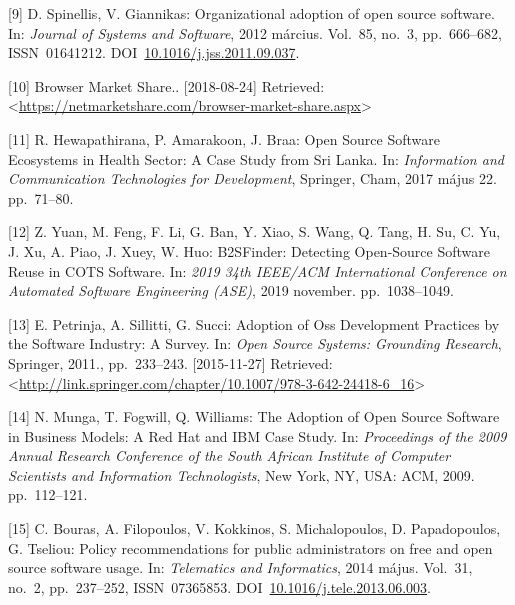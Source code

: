 \documentclass[12pt,magyar,a4paper,oneside]{scrreprt}
\newenvironment{cslreferences}%
  {}%
  {\par}
\begin{document}
\begin{cslreferences}
\leavevmode\hypertarget{ref-spinellis_organizational_2012}{}%
{[}9{]} D. Spinellis, V. Giannikas: Organizational adoption of open
source software. In: \emph{Journal of Systems and Software}, 2012
március. Vol.~85, no.~3, pp.~666--682, ISSN~01641212.
DOI~\href{https://doi.org/10.1016/j.jss.2011.09.037}{10.1016/j.jss.2011.09.037}.

\leavevmode\hypertarget{ref-noauthor_browser_nodate}{}%
{[}10{]} Browser Market Share.. {[}2018-08-24{]} Retrieved:
\textless{}\url{https://netmarketshare.com/browser-market-share.aspx}\textgreater{}

\leavevmode\hypertarget{ref-hewapathirana_open_2017}{}%
{[}11{]} R. Hewapathirana, P. Amarakoon, J. Braa: Open Source Software
Ecosystems in Health Sector: A Case Study from Sri Lanka. In:
\emph{Information and Communication Technologies for Development},
Springer, Cham, 2017 május 22. pp.~71--80.

\leavevmode\hypertarget{ref-yuan_b2sfinder_2019}{}%
{[}12{]} Z. Yuan, M. Feng, F. Li, G. Ban, Y. Xiao, S. Wang, Q. Tang, H.
Su, C. Yu, J. Xu, A. Piao, J. Xuey, W. Huo: B2SFinder: Detecting
Open-Source Software Reuse in COTS Software. In: \emph{2019 34th
IEEE/ACM International Conference on Automated Software Engineering
(ASE)}, 2019 november. pp.~1038--1049.

\leavevmode\hypertarget{ref-petrinja_adoption_2011}{}%
{[}13{]} E. Petrinja, A. Sillitti, G. Succi: Adoption of Oss Development
Practices by the Software Industry: A Survey. In: \emph{Open Source
Systems: Grounding Research}, Springer, 2011., pp.~233--243.
{[}2015-11-27{]} Retrieved:
\textless{}\url{http://link.springer.com/chapter/10.1007/978-3-642-24418-6_16}\textgreater{}

\leavevmode\hypertarget{ref-munga_adoption_2009}{}%
{[}14{]} N. Munga, T. Fogwill, Q. Williams: The Adoption of Open Source
Software in Business Models: A Red Hat and IBM Case Study. In:
\emph{Proceedings of the 2009 Annual Research Conference of the South
African Institute of Computer Scientists and Information Technologists},
New York, NY, USA: ACM, 2009. pp.~112--121.

\leavevmode\hypertarget{ref-bouras_policy_2014}{}%
{[}15{]} C. Bouras, A. Filopoulos, V. Kokkinos, S. Michalopoulos, D.
Papadopoulos, G. Tseliou: Policy recommendations for public
administrators on free and open source software usage. In:
\emph{Telematics and Informatics}, 2014 május. Vol.~31, no.~2,
pp.~237--252, ISSN~07365853.
DOI~\href{https://doi.org/10.1016/j.tele.2013.06.003}{10.1016/j.tele.2013.06.003}.


\end{cslreferences}
\end{document}
